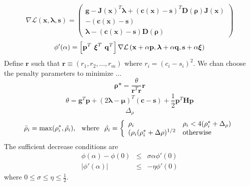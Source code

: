 \documentclass[]{aiaa-tc}%
\begin{document}
%
\begin{equation}
     \nabla \mathcal{L}\left( \mathbf{x}, \boldsymbol{\lambda}, \mathbf{s} \right) = \left(
     \begin{array}{c}
          \mathbf{g}  -  \mathbf{J}(\mathbf{x})^T \boldsymbol{\lambda} + \left(\mathbf{c}(\mathbf{x}) - \mathbf{s} \right)^T \mathbf{D}(\boldsymbol{\rho}) \mathbf{J}(\mathbf{x})\\
           -\left(\mathbf{c}(\mathbf{x}) - \mathbf{s} \right) \\
           \boldsymbol{\lambda} - \left(\mathbf{c}(\mathbf{x}) - \mathbf{s} \right)\mathbf{D}(\boldsymbol{\rho})
     \end{array}
     \right)
\end{equation}
%
\begin{equation}
     \phi'(\alpha) = \left[\mathbf{p}^T  \hspace{.05 in} \boldsymbol{\xi}^T \hspace{.05 in} \mathbf{q}^T \right]
      \nabla \mathcal{L}\left( \mathbf{x}+\alpha \mathbf{p}, \boldsymbol{\lambda}+\alpha \mathbf{q}, \mathbf{s} +\alpha \boldsymbol{\xi}\right)
\end{equation}
%
Define $\mathbf{r}$ such that $ \mathbf{r} \equiv \left( r_1,
r_2,...,r_m\right)$ where $r_i = (c_i - s_i)^2$.  We chan choose the
penalty parameters to minimize ...
%
\begin{equation}
    \boldsymbol{\rho}* = \frac{\theta}{\mathbf{r}^T \mathbf{r}} \mathbf{r}
\end{equation}
%
\begin{equation}
    \theta = \mathbf{g}^T\mathbf{p} + (2 \boldsymbol{\lambda} - \boldsymbol{\mu})^T(\mathbf{c} - \mathbf{s}) +
    \displaystyle\frac{1}{2}\mathbf{p}^T\mathbf{H}\mathbf{p}
\end{equation}
%
\begin{equation}
    \Delta_\rho
\end{equation}
%
\begin{equation}
 \bar{\rho}_i = \mbox{max}(\rho^*_i, \hat{\rho_i} ),  \hspace{.1 in} \mbox{where} \hspace{.1 in} \hat{\rho_i} = \left\{
    \begin{array}{llcc}
        \rho_i                                & \rho_i < 4(\rho_i^* + \Delta_\rho)  \\
        (\rho_i(\rho_i^* + \Delta \rho)^{1/2} & \mbox{otherwise}  \\
    \end{array}
 \right.
\end{equation}
%
The sufficient decrease conditions are
%
\begin{eqnarray}
    \phi(\alpha) - \phi(0) &\leq& \sigma \alpha \phi'(0)\\
    | \phi'(\alpha) | & \leq & -\eta \phi'(0)
\end{eqnarray}
%
where $0 \leq \sigma \leq \eta \leq \frac{1}{2}$.
\end{document}
